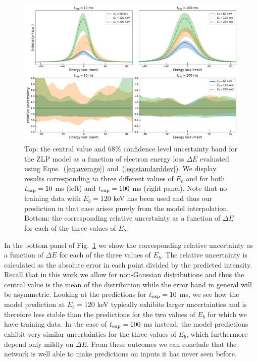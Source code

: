 \begin{figure}[H]
    \centering
    \includegraphics[width=150mm]{plots/deltaE_dependence_vacuum.pdf}
    \caption{Top: the central value and 68\% confidence level uncertainty band
      for the ZLP model as a function
      of electron energy loss $\Delta E$
      evaluated using Eqns.~(\ref{eq:average}) and~(\ref{eq:standarddev}).
      We display results corresponding to 
      three different values of $E_b$  and for both
      $t_{\rm exp}=10$ ms (left)  and $t_{\rm exp}=100$ ms (right panel).
      Note that no training data with $E_b=120$ keV has been used and thus our prediction
      in that case arises purely from the model interpolation.
      Bottom: the corresponding relative uncertainty as a function of $\Delta E$
      for each of the three values of $E_b$.
      }
      \label{fig:EELS_vacuum_DeltaE}
\end{figure}

In the bottom panel of Fig.~\ref{fig:EELS_vacuum_DeltaE} we show
the corresponding relative uncertainty as a function of $\Delta E$
for each of the three values of $E_b$.
%
The relative uncertainty is calculated as the absolute error in each point divided
by the predicted intensity.
%
Recall that in this work we allow for non-Gaussian distributions and thus the central
value is the mean of the distribution while the error band in general will
be asymmetric.
%
Looking at the predictions for $t_{\rm exp}=10$ ms, we see how the model prediction
at $E_b=120$ keV typically exhibits larger uncertainties and is therefore less stable than the predictions
for the two values of $E_b$ for which we have training data.
%
In the case of $t_{\rm exp}=100$ ms instead, the model predictions exhibit very similar
uncertainties for the three values of $E_b$, which furthermore depend only mildly on $\Delta E$.
%
From these outcomes we can conclude that the network is well able to make predictions 
on inputs it has never seen before. 

